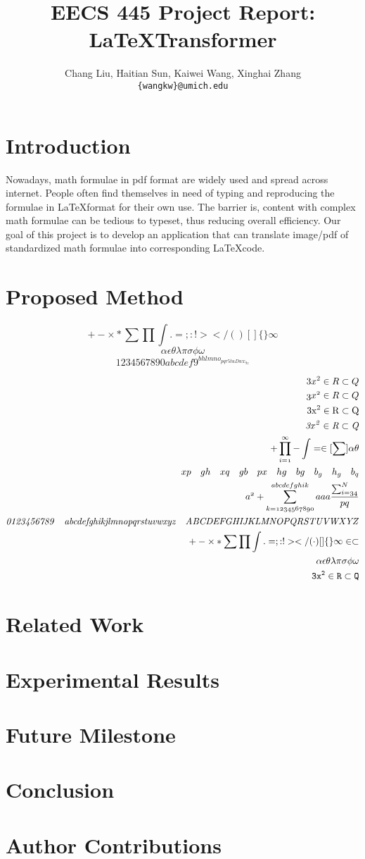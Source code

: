 \documentclass[11pt,letterpaper]{article}
\title{EECS 445 Project Report: \\
	\LaTeX Transformer}
\author{Chang Liu, Haitian Sun, Kaiwei Wang, Xinghai Zhang\\
	\texttt{\{wangkw\}@umich.edu}
}
\begin{document}
\maketitle
\section{Introduction}
Nowadays, math formulae in pdf format are widely used and spread across internet. People often find themselves in need of typing and reproducing the formulae in \LaTeX format for their own use. The barrier is, content with complex math formulae can be tedious to typeset, thus reducing overall efficiency. Our goal of this project is to develop an application that can translate image/pdf of standardized math formulae into corresponding \LaTeX code.
\section{Proposed Method}
\[ +-\times * \sum \prod \int . = ; : ! > < / ( ) [] \{ \} \infty  \]
\[ \alpha \epsilon \theta \lambda \pi \sigma \phi \omega \]
\[ 1234567890abcdef9^{bhlmno_{pqr5tuDwx_{9z}}} \]

\begin{align*}
3x^2 \in R \subset Q \\
\mathnormal{3x^2 \in R \subset Q} \\
\mathrm{3x^2 \in R \subset Q} \\
\mathit{3x^2 \in R \subset Q} \\
\mathnormal{  + \prod_{i=1}^\infty - \int = \in [\sum]\alpha \theta} \\
\mathnormal{xp \quad gh \quad xq \quad gb \quad px \quad hg \quad bg \quad b_g \quad h_g \quad b_q} \\
\mathnormal{a^{2}+\sum^{abcdefghik}_{k=1234567890}aaa\frac{\sum^{N}_{i=34}}{pq}} \\
\mathit{0123456789\quad abcdefghikjlmnopqrstuvwxyz\quad ABCDEFGHIJKLMNOPQRSTUVWXYZ} \\
\mathtt{ +-\times * \sum \prod \int . = ; : ! >  < / ( \cdot ) [] \{ \} \infty \in \subset}\\
\mathtt{\alpha \epsilon \theta \lambda \pi \sigma \phi \omega}\\
\mathtt{3x^2 \in R \subset Q} 
\end{align*}


\section{Related Work}
\section{Experimental Results}
\section{Future Milestone}
\section{Conclusion}
\section*{Author Contributions}


\end{document}
